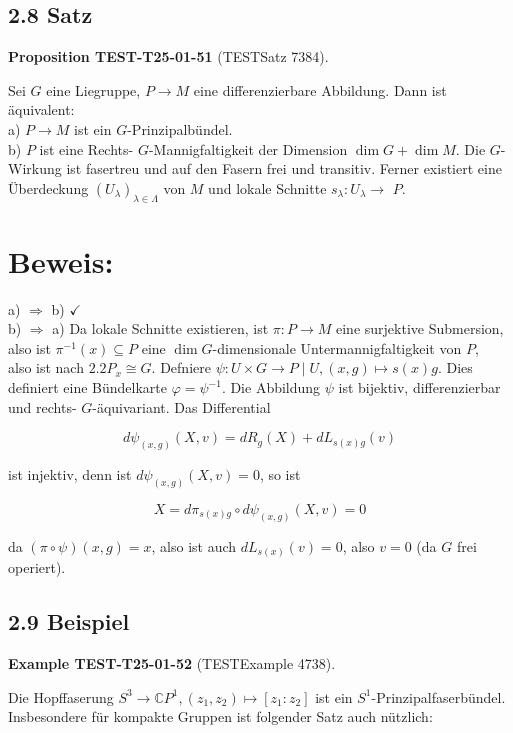 \documentclass[10pt, letterpaper]{article}
\newcommand{\CustomHeading}[3]{%
  \par\medskip\noindent%
  \textbf{#1 #2} \textnormal{(#3)}.\enskip%
}
\newenvironment{PROP}[2]{\begin{unitbox}\CustomHeading{Proposition}{#1}{#2}}{\end{unitbox}}
\newenvironment{EXA}[2]{\begin{unitbox}\CustomHeading{Example}{#1}{#2}}{\end{unitbox}}
\begin{document}
\subsection*{2.8 Satz}
\begin{PROP}{TEST-T25-01-51}{TESTSatz 7384}
Sei $G$ eine Liegruppe, $P \rightarrow M$ eine differenzierbare Abbildung. Dann ist äquivalent:\\
a) $P \rightarrow M$ ist ein $G$-Prinzipalbündel.\\
b) $P$ ist eine Rechts- $G$-Mannigfaltigkeit der Dimension $\operatorname{dim} G+\operatorname{dim} M$. Die $G$-Wirkung ist fasertreu und auf den Fasern frei und transitiv. Ferner existiert eine Überdeckung $\left(U_{\lambda}\right)_{\lambda \in \Lambda}$ von $M$ und lokale Schnitte $s_{\lambda}: U_{\lambda} \rightarrow$ $P$.
\end{PROP}

\section*{Beweis:}
a) $\Rightarrow$ b) $\checkmark$\\
b) $\Rightarrow$ a) Da lokale Schnitte existieren, ist $\pi: P \rightarrow M$ eine surjektive Submersion, also ist $\pi^{-1}(x) \subseteq P$ eine $\operatorname{dim} G$-dimensionale Untermannigfaltigkeit von $P$,\\
also ist nach $2.2 P_{x} \cong G$. Defniere $\psi: U \times G \rightarrow P \mid U,(x, g) \mapsto s(x) g$. Dies definiert eine Bündelkarte $\varphi=\psi^{-1}$. Die Abbildung $\psi$ ist bijektiv, differenzierbar und rechts- $G$-äquivariant. Das Differential

$$
d \psi_{(x, g)}(X, v)=d R_{g}(X)+d L_{s(x) g}(v)
$$

ist injektiv, denn ist $d \psi_{(x, g)}(X, v)=0$, so ist

$$
X=d \pi_{s(x) g} \circ d \psi_{(x, g)}(X, v)=0
$$

da $(\pi \circ \psi)(x, g)=x$, also ist auch $d L_{s(x)}(v)=0$, also $v=0$ (da $G$ frei operiert).

\subsection*{2.9 Beispiel}
\begin{EXA}{TEST-T25-01-52}{TESTExample 4738}
Die Hopffaserung $S^{3} \rightarrow \mathbb{C} P^{1},\left(z_{1}, z_{2}\right) \mapsto\left[z_{1}: z_{2}\right]$ ist ein $S^{1}$-Prinzipalfaserbündel.\\
Insbesondere für kompakte Gruppen ist folgender Satz auch nützlich:
\end{EXA}
\end{document}
